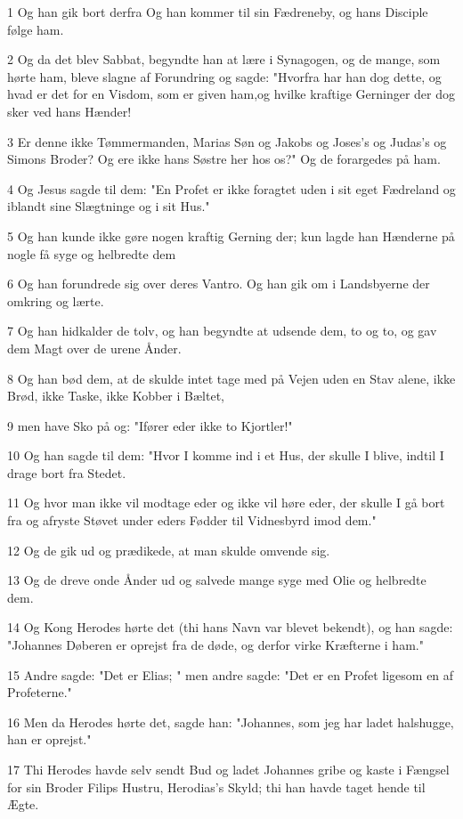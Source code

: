 \par 1 Og han gik bort derfra Og han kommer til sin Fædreneby, og hans Disciple følge ham.
\par 2 Og da det blev Sabbat, begyndte han at lære i Synagogen, og de mange, som hørte ham, bleve slagne af Forundring og sagde: "Hvorfra har han dog dette, og hvad er det for en Visdom, som er given ham,og hvilke kraftige Gerninger der dog sker ved hans Hænder!
\par 3 Er denne ikke Tømmermanden, Marias Søn og Jakobs og Joses's og Judas's og Simons Broder? Og ere ikke hans Søstre her hos os?" Og de forargedes på ham.
\par 4 Og Jesus sagde til dem: "En Profet er ikke foragtet uden i sit eget Fædreland og iblandt sine Slægtninge og i sit Hus."
\par 5 Og han kunde ikke gøre nogen kraftig Gerning der; kun lagde han Hænderne på nogle få syge og helbredte dem
\par 6 Og han forundrede sig over deres Vantro. Og han gik om i Landsbyerne der omkring og lærte.
\par 7 Og han hidkalder de tolv, og han begyndte at udsende dem, to og to, og gav dem Magt over de urene Ånder.
\par 8 Og han bød dem, at de skulde intet tage med på Vejen uden en Stav alene, ikke Brød, ikke Taske, ikke Kobber i Bæltet,
\par 9 men have Sko på og: "Ifører eder ikke to Kjortler!"
\par 10 Og han sagde til dem: "Hvor I komme ind i et Hus, der skulle I blive, indtil I drage bort fra Stedet.
\par 11 Og hvor man ikke vil modtage eder og ikke vil høre eder, der skulle I gå bort fra og afryste Støvet under eders Fødder til Vidnesbyrd imod dem."
\par 12 Og de gik ud og prædikede, at man skulde omvende sig.
\par 13 Og de dreve onde Ånder ud og salvede mange syge med Olie og helbredte dem.
\par 14 Og Kong Herodes hørte det (thi hans Navn var blevet bekendt), og han sagde: "Johannes Døberen er oprejst fra de døde, og derfor virke Kræfterne i ham."
\par 15 Andre sagde: "Det er Elias; " men andre sagde: "Det er en Profet ligesom en af Profeterne."
\par 16 Men da Herodes hørte det, sagde han: "Johannes, som jeg har ladet halshugge, han er oprejst."
\par 17 Thi Herodes havde selv sendt Bud og ladet Johannes gribe og kaste i Fængsel for sin Broder Filips Hustru, Herodias's Skyld; thi han havde taget hende til Ægte.
